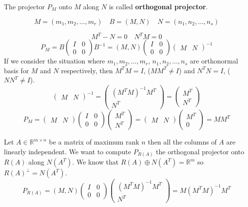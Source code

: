 The projector $P_M$ onto $M$ along $N$ is called \textbf{orthogonal projector}.

$$
M = (m_1, m_2, \ldots, m_r) \quad B = (M, N) \quad N = (n_1, n_2, \ldots, n_s)
$$

$$
M^T - N = 0 \quad N^T M = 0
$$
$$
P_M = B\begin{pmatrix}
I & 0 \\
0 & 0
\end{pmatrix}B^{-1} = (M, N)\begin{pmatrix}
I & 0 \\
0 & 0
\end{pmatrix}\begin{pmatrix}
M & N
\end{pmatrix}^{-1}
$$
If we consider the situation where $m_1, m_2, \ldots, m_r$, $n_1, n_2, \ldots, n_s$ are orthonormal basis for $M$ and $N$ respectively, then
$ M^TM = I$, ($MM^T \neq I$) and $N^TN = I$, ($NN^T \neq I$).
$$
\begin{pmatrix}
    M & N
\end{pmatrix}^{-1} = \begin{pmatrix}
    (M^TM)^{-1}M^T \\
    N^T
\end{pmatrix} = \begin{pmatrix}
    M^T \\
    N^T
\end{pmatrix}
$$
$$
P_M = \begin{pmatrix}
    M & N
\end{pmatrix}\begin{pmatrix}
    I & 0 \\
    0 & 0
\end{pmatrix}\begin{pmatrix}
    M^T \\
    N^T
\end{pmatrix} = \begin{pmatrix}
    M & N
\end{pmatrix}\begin{pmatrix}
    M^T \\
    0
\end{pmatrix} = MM^T
$$

Let $A \in \mathbb{R}^{m \times n}$ be a matrix of maximum rank $n$ then all the columns of $A$ are linearly independent.
We want to compute $P_{R(A)}$ the orthogonal projector onto $R(A)$ along $N(A^T)$. We know that $R(A) \oplus N(A^T) = \mathbb{R}^m$ so $R(A)^{\perp} = N(A^T)$.
$$ P_{R(A)} = (M, N)\begin{pmatrix}
    I & 0 \\
    0 & 0
    \end{pmatrix}\begin{pmatrix}
        (M^TM)^{-1}M^T \\
        N^T
    \end{pmatrix} = M(M^TM)^{-1}M^T $$

